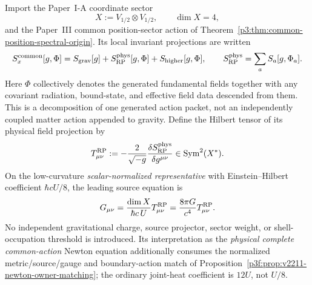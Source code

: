 \documentclass[12pt,a4paper]{article}
\begin{document}
\begin{theorem}
\label{p8:thm:reciprocal-position-source-normalization}
Import the Paper~I-A coordinate sector
\[
    X:=V_{1/2}\otimes V_{1/2},
    \qquad
    \dim X=4,
\]
and the Paper~III common position-sector action of
Theorem~\ref{p3:thm:common-position-spectral-origin}.  Its local invariant
projections are written
\[
  S_{x}^{\rm common}[g,\Phi]
  =S_{\rm grav}[g]
   +S_{\rm RP}^{\rm phys}[g,\Phi]
   +S_{\rm higher}[g,\Phi],
  \qquad
  S_{\rm RP}^{\rm phys}=\sum_a S_a[g,\Phi_a].
\]
Here \(\Phi\) collectively denotes the generated fundamental fields together
with any covariant radiation, bound-state, and effective field data descended
from them.  This is a decomposition of one generated action packet, not an
independently coupled matter action appended to gravity.  Define the Hilbert
tensor of its physical field projection by
\[
  T^{\rm RP}_{\mu\nu}
  :=
  -\frac{2}{\sqrt{-g}}
  \frac{\delta S_{\rm RP}^{\rm phys}}{\delta g^{\mu\nu}}
  \in\operatorname{Sym}^2(X^*).
\]
On the low-curvature \emph{scalar-normalized representative} with
Einstein--Hilbert coefficient $\hbar cU/8$, the leading
source equation is
\[
    G_{\mu\nu}
    =
    \frac{\dim X}{\hbar c\,U}
    T^{\rm RP}_{\mu\nu}
    =
    \frac{8\pi G}{c^4}
    T^{\rm RP}_{\mu\nu}.
\]
No independent gravitational charge, source projector, sector weight, or
shell-occupation threshold is introduced.
Its interpretation as the \emph{physical complete common-action}
Newton equation additionally consumes the normalized metric/source/gauge
and boundary-action match of
Proposition~\ref{p3f:prop:v2211-newton-owner-matching}; the
ordinary joint-heat coefficient is $12U$, not $U/8$.
\end{theorem}
\end{document}

